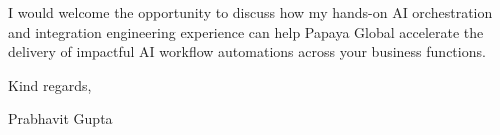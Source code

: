 \documentclass[11pt,a4paper]{article}
\begin{document}
\noindent I would welcome the opportunity to discuss how my hands-on AI orchestration and integration engineering experience can help Papaya Global accelerate the delivery of impactful AI workflow automations across your business functions.

\vspace{8pt}

\noindent Kind regards,

\vspace{6pt}

\noindent Prabhavit Gupta
\end{document}
